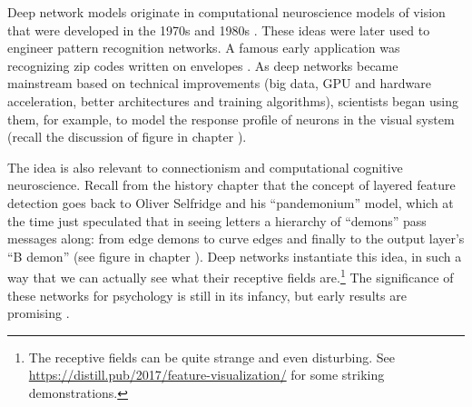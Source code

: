 Deep network models originate in  computational neuroscience models of vision that were developed in the 1970s and 1980s \cite{fukushima1982neocognitron}.  These ideas were later used to engineer pattern recognition networks. A famous early application was recognizing zip codes written on envelopes \cite{lecun1989backpropagation}. As deep networks became mainstream based on technical improvements (big data, GPU and hardware acceleration, better architectures and training algorithms), scientists began using them, for example, to model the response profile of neurons in the visual system (recall the discussion of figure  in chapter ). 

The idea is also relevant to connectionism and computational cognitive neuroscience. Recall from the history chapter that the concept of layered feature detection goes back to Oliver Selfridge and his ``pandemonium'' model, which at the time just speculated that in seeing letters a hierarchy of ``demons'' pass messages along: from edge demons to curve edges and finally to the output layer's ``B demon'' (see figure  in chapter ). Deep networks instantiate this idea, in such a way that we can actually  see what their receptive fields are.\footnote{The receptive fields can be quite strange and even disturbing. See \url{https://distill.pub/2017/feature-visualization/} for some striking demonstrations.}  The significance of these networks for psychology is still in its infancy, but early results are promising \cite{zorzi2013modeling, ritter2017cognitive}.

